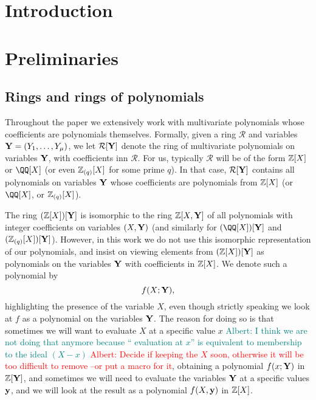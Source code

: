 \documentclass[11pt,letterpaper,usenames,dvipsnames]{article}
\title{\stylizedtitle}
\author{
	Albert Garreta, Psi Vesely, Arantxa Zapico
}
\date{\today}
\newcommand{\albert}[1]{\textcolor{teal}{Albert: {#1}}}
\newcommand{\alberturgent}[1]{\textcolor{red}{Albert: {#1}}}
\begin{document}
\maketitle

\begin{abstract}
\end{abstract}

\setcounter{tocdepth}{3}
\begin{spacing}{0.8}
{\footnotesize \tableofcontents}
\end{spacing}
\newcommand{\cR}{\mathcal{R}}

\section{Introduction}


\section{Preliminaries}

        

\subsection{Rings and rings of polynomials} Throughout the paper we extensively work with multivariate polynomials whose coefficients are polynomials themselves. Formally, given a ring $\cR$ and variables $\mathbf{Y}=(Y_1,\ldots, Y_\mu)$, we let $\cR[\YY]$ denote the ring of multivariate polynomials on variables $\mathbf{Y}$, with coefficients inn $\cR$. For us, typically $\cR$ will be of the form $\mathbb{Z}[X]$ or $\QQ[X]$ (or even $\mathbb{Z}_{(q)}[X]$ for some prime $q$). In that case, $\cR[\YY]$ contains all polynomials on variables $\mathbf{Y}$ whose coefficients are polynomials from $\mathbb{Z}[X]$ (or $\QQ[X]$, or $\mathbb{Z}_{(q)}[X]$). 

The ring $(\mathbb{Z}[X])[\mathbf{Y}]$ is isomorphic to the ring $\mathbb{Z}[X, \mathbf{Y}]$ of all polynomials with integer coefficients on variables $(X,\mathbf{Y})$  (and similarly for $(\QQ[X])[\YY]$ and $(\mathbb{Z}_{(q)}[X])[\mathbf{Y}]$). However, in this work we do not use this isomorphic representation of our polynomials, and insist on viewing elements from $(\mathbb{Z}[X])[\mathbf{Y}]$ as polynomials on the variables $\mathbf{Y}$ with coefficients in $\mathbb{Z}[X]$. We denote such a polynomial by $$f(X;\mathbf{Y}),$$
highlighting the presence of the variable $X$, even though strictly speaking we look at $f$ as a polynomial on the variables $\mathbf{Y}$. The reason for doing so is that sometimes we will want to evaluate $X$ at a specific value $x$ \albert{I think we are not doing that anymore because `` evaluation at $x$'' is equivalent to membership to the ideal $(X-x)$} \alberturgent{Decide if keeping the $X$ soon, otherwise it will be too difficult to remove --or put a macro for it}, obtaining a polynomial $f(x;\mathbf{Y})$ in $\mathbb{Z}[\mathbf{Y}]$, and sometimes we will need to evaluate the variables $\mathbf{Y}$ at a specific values $\mathbf{y}$, and we will look at the result as  a polynomial $f(X,\mathbf{y})$ in $\mathbb{Z}[X]$. 
\end{document}
